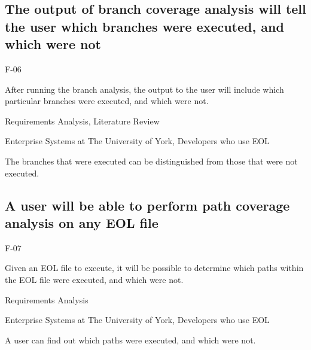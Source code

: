 \subsection{The output of branch coverage analysis will tell the user which branches were executed, and which were not}
\begin{description}[style=sameline,leftmargin=4.5cm,nolistsep]
\item[\hspace*{0.3cm}Label] F-06
\item[\hspace*{0.3cm}Description] After running the branch analysis, the output to the user will include which particular branches were executed, and which were not.
\item[\hspace*{0.3cm}Source] Requirements Analysis, Literature Review
\item[\hspace*{0.3cm}Stakeholders] Enterprise Systems at The University of York, Developers who use EOL
\item[\hspace*{0.3cm}Satisfiable Conditions] The branches that were executed can be distinguished from those that were not executed.
\end{description}

\subsection{A user will be able to perform path coverage analysis on any EOL file}
\begin{description}[style=sameline,leftmargin=4.5cm,nolistsep]
\item[\hspace*{0.3cm}Label] F-07
\item[\hspace*{0.3cm}Description] Given an EOL file to execute, it will be possible to determine which paths within the EOL file were executed, and which were not.
\item[\hspace*{0.3cm}Source] Requirements Analysis
\item[\hspace*{0.3cm}Stakeholders] Enterprise Systems at The University of York, Developers who use EOL
\item[\hspace*{0.3cm}Satisfiable Conditions] A user can find out which paths were executed, and which were not.
\end{description}

